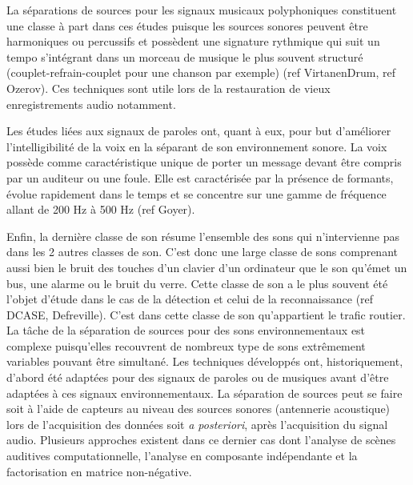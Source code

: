 La séparations de sources pour les signaux musicaux polyphoniques constituent une classe à part dans ces études puisque les sources sonores peuvent être harmoniques ou percussifs et possèdent une signature rythmique qui suit un tempo s'intégrant dans un morceau de musique le plus souvent structuré (couplet-refrain-couplet pour une chanson par exemple) (ref VirtanenDrum, ref Ozerov). Ces techniques sont utile lors de la restauration de vieux enregistrements audio notamment. 

Les études liées aux signaux de paroles ont, quant à eux, pour but d'améliorer l'intelligibilité de la voix en la séparant de son environnement sonore. La voix possède comme caractéristique unique de porter un message devant être compris par un auditeur ou une foule. Elle est caractérisée par la présence de formants, évolue rapidement dans le temps et se concentre sur une gamme de fréquence allant de 200 Hz à 500 Hz (ref Goyer). 

Enfin, la dernière classe de son résume l'ensemble des sons qui n'intervienne pas dans les 2 autres classes de son. C'est donc une large classe de sons comprenant aussi bien le bruit des touches d'un clavier d'un ordinateur que le son qu'émet un bus, une alarme ou le bruit du verre. Cette classe de son a le plus souvent été l'objet d'étude dans le cas de la détection et celui de la reconnaissance (ref DCASE, Defreville). C'est dans cette classe de son qu'appartient le trafic routier. \\

La tâche de la séparation de sources pour des sons environnementaux est complexe puisqu'elles recouvrent de nombreux type de sons extrêmement variables pouvant être simultané. Les techniques développés ont, historiquement, d'abord été adaptées pour des signaux de paroles ou de musiques avant d'être adaptées à ces signaux environnementaux. La séparation de sources peut se faire soit à l'aide de capteurs au niveau des sources sonores (antennerie acoustique) lors de l'acquisition des données soit \textit{a posteriori}, après l'acquisition du signal audio. Plusieurs approches existent dans ce dernier cas dont l'analyse de scènes auditives computationnelle, l'analyse en composante indépendante et la factorisation en matrice non-négative.

